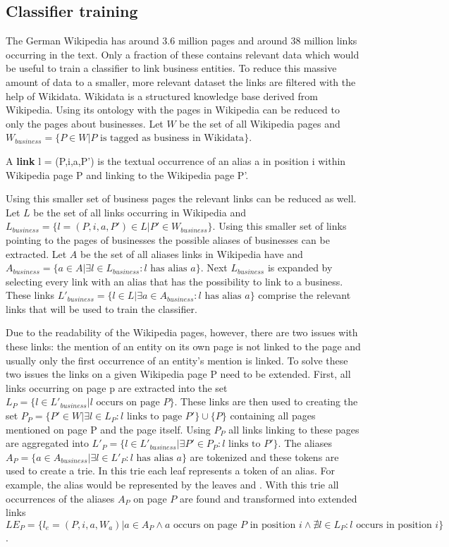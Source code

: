 \subsection{Classifier training}
The German Wikipedia has around 3.6 million pages and around 38 million links occurring in the text. Only a fraction of these contains relevant data which would be useful to train a classifier to link business entities. To reduce this massive amount of data to a smaller, more relevant dataset the links are filtered with the help of Wikidata. Wikidata is a structured knowledge base derived from Wikipedia. Using its ontology with the pages in Wikipedia can be reduced to only the pages about businesses. Let $W$ be the set of all Wikipedia pages and $W_{business} = \{ P \in W | P \text{ is tagged as business in Wikidata} \}$.
\begin{definition}
A \textbf{link} l = (P,i,a,P') is the textual occurrence of an alias a in position i within Wikipedia page P and linking to the Wikipedia page P'.
\label{link}
\end{definition}
Using this smaller set of business pages the relevant links can be reduced as well. Let $L$ be the set of all links occurring in Wikipedia and $L_{business} = \{ l = (P,i,a,P') \in L | P' \in W_{business} \}$. Using this smaller set of links pointing to the pages of businesses the possible aliases of businesses can be extracted. Let $A$ be the set of all aliases links in Wikipedia have and $A_{business} = \{ a \in A | \exists l \in L_{business}: l \text{ has alias } a \}$. Next $L_{business}$ is expanded by selecting every link with an alias that has the possibility to link to a business. These links $L'_{business} = \{ l \in L | \exists a \in A_{business}: l \text{ has alias } a \}$ comprise the relevant links that will be used to train the classifier.\par
Due to the readability of the Wikipedia pages, however, there are two issues with these links: the mention of an entity on its own page is not linked to the page and usually only the first occurrence of an entity's mention is linked. To solve these two issues the links on a given Wikipedia page P need to be extended. First, all links occurring on page p are extracted into the set $L_P = \{ l \in L'_{business} | l \text{ occurs on page } P\}$. These links are then used to creating the set $P_P = \{ P' \in W | \exists l \in L_P: l \text{ links to page } P' \} \cup \{P\}$ containing all pages mentioned on page P and the page itself. Using $P_P$ all links linking to these pages are aggregated into $L'_P = \{ l \in L'_{business} | \exists P' \in P_P: l \text{ links to } P' \}$. The aliases $A_P = \{a \in A_{business} | \exists l \in L'_P: l \text{ has alias } a \}$ are tokenized and these tokens are used to create a trie. In this trie each leaf represents a token of an alias. For example, the alias  would be represented by the leaves  and . With this trie all occurrences of the aliases $A_P$ on page $P$ are found and transformed into extended links $LE_P = \{ l_e = (P, i, a, W_a) | a \in A_P \land a \text{ occurs on page } P \text{ in position } i \land \nexists l \in L_P: l \text{ occurs in position } i \}$.
